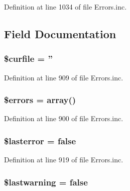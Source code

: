 \-Definition at line 1034 of file \-Errors.\-inc.




\subsection{\-Field \-Documentation}
\hypertarget{class_error_tracker_a84352b4d740a45279b61228864b9b5e7}{
\subsubsection[{\$curfile}]{\setlength{\rightskip}{0pt plus 5cm}\$curfile = ''}}\label{class_error_tracker_a84352b4d740a45279b61228864b9b5e7}


\-Definition at line 909 of file \-Errors.\-inc.

\hypertarget{class_error_tracker_ab24faf4aa647cdcee494fc48524ad4ff}{
\subsubsection[{\$errors}]{\setlength{\rightskip}{0pt plus 5cm}\$errors = array()}}\label{class_error_tracker_ab24faf4aa647cdcee494fc48524ad4ff}


\-Definition at line 900 of file \-Errors.\-inc.

\hypertarget{class_error_tracker_a23ed1c329afe91715e872afa5412dbdc}{
\subsubsection[{\$lasterror}]{\setlength{\rightskip}{0pt plus 5cm}\$lasterror = false}}\label{class_error_tracker_a23ed1c329afe91715e872afa5412dbdc}


\-Definition at line 919 of file \-Errors.\-inc.

\hypertarget{class_error_tracker_a51bd31003f4ad35205a62bcbff2eece9}{
\subsubsection[{\$lastwarning}]{\setlength{\rightskip}{0pt plus 5cm}\$lastwarning = false}}\label{class_error_tracker_a51bd31003f4ad35205a62bcbff2eece9}


